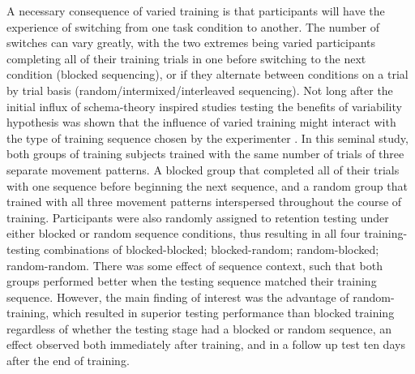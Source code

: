 \documentclass[
  12pt,
  letterpaper,
]{article}
\begin{document}
A necessary consequence of varied training is that participants will
have the experience of switching from one task condition to another. The
number of switches can vary greatly, with the two extremes being varied
participants completing all of their training trials in one before
switching to the next condition (blocked sequencing), or if they
alternate between conditions on a trial by trial basis
(random/intermixed/interleaved sequencing). Not long after the initial
influx of schema-theory inspired studies testing the benefits of
variability hypothesis was shown that the influence of varied training
might interact with the type of training sequence chosen by the
experimenter \autocite{sheaContextualInterferenceEffects1979}. In this
seminal study, both groups of training subjects trained with the same
number of trials of three separate movement patterns. A blocked group
that completed all of their trials with one sequence before beginning
the next sequence, and a random group that trained with all three
movement patterns interspersed throughout the course of training.
Participants were also randomly assigned to retention testing under
either blocked or random sequence conditions, thus resulting in all four
training-testing combinations of blocked-blocked; blocked-random;
random-blocked; random-random. There was some effect of sequence
context, such that both groups performed better when the testing
sequence matched their training sequence. However, the main finding of
interest was the advantage of random-training, which resulted in
superior testing performance than blocked training regardless of whether
the testing stage had a blocked or random sequence, an effect observed
both immediately after training, and in a follow up test ten days after
the end of training.
\end{document}
